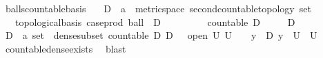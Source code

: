 \begin{isabellebody}
\begin{isamarkuptext}
\end{isamarkuptext}\isamarkuptrue%
\isamarkupfalse%
\ balls{\isacharunderscore}{\kern0pt}countable{\isacharunderscore}{\kern0pt}basis{\isacharcolon}{\kern0pt}\isanewline
\ \ \ D\ {\isacharcolon}{\kern0pt}{\isacharcolon}{\kern0pt}\ {\isachardoublequoteopen}{\isacharprime}{\kern0pt}a\ {\isacharcolon}{\kern0pt}{\isacharcolon}{\kern0pt}\ {\isacharbraceleft}{\kern0pt}metric{\isacharunderscore}{\kern0pt}space{\isacharcomma}{\kern0pt}\ second{\isacharunderscore}{\kern0pt}countable{\isacharunderscore}{\kern0pt}topology{\isacharbraceright}{\kern0pt}\ set{\isachardoublequoteclose}\ \isanewline
\ \ \ {\isachardoublequoteopen}topological{\isacharunderscore}{\kern0pt}basis\ {\isacharparenleft}{\kern0pt}case{\isacharunderscore}{\kern0pt}prod\ ball\ {\isacharbackquote}{\kern0pt}\ {\isacharparenleft}{\kern0pt}D\ {\isasymtimes}\ {\isacharparenleft}{\kern0pt}{\isasymrat}\ {\isasyminter}\ {\isacharbraceleft}{\kern0pt}{}{\isacharless}{\kern0pt}{\isachardot}{\kern0pt}{\isachardot}{\kern0pt}{\isacharbraceright}{\kern0pt}{\isacharparenright}{\kern0pt}{\isacharparenright}{\kern0pt}{\isacharparenright}{\kern0pt}{\isachardoublequoteclose}\isanewline
\ \ \ \ \ {\isachardoublequoteopen}countable\ D{\isachardoublequoteclose}\isanewline
\ \ \ \ \ {\isachardoublequoteopen}D\ {\isasymnoteq}\ {\isacharbraceleft}{\kern0pt}{\isacharbraceright}{\kern0pt}{\isachardoublequoteclose}\ \ \ \ \isanewline
%
\isadelimproof
%
\endisadelimproof
%
\isatagproof
{}\isamarkupfalse%
\ {\isacharminus}{\kern0pt}\isanewline
\ \ \isamarkupfalse%
\ D\ {\isacharcolon}{\kern0pt}{\isacharcolon}{\kern0pt}\ {\isachardoublequoteopen}{\isacharprime}{\kern0pt}a\ set{\isachardoublequoteclose}\ \ dense{\isacharunderscore}{\kern0pt}subset{\isacharcolon}{\kern0pt}\ {\isachardoublequoteopen}countable\ D{\isachardoublequoteclose}\ {\isachardoublequoteopen}D\ {\isasymnoteq}\ {\isacharbraceleft}{\kern0pt}{\isacharbraceright}{\kern0pt}{\isachardoublequoteclose}\ {\isachardoublequoteopen}{\isasymlbrakk}open\ U{\isacharsemicolon}{\kern0pt}\ U\ {\isasymnoteq}\ {\isacharbraceleft}{\kern0pt}{\isacharbraceright}{\kern0pt}{\isasymrbrakk}\ {\isasymLongrightarrow}\ {\isasymexists}y\ {\isasymin}\ D{\isachardot}{\kern0pt}\ y\ {\isasymin}\ U{\isachardoublequoteclose}\ \ U\ \isamarkupfalse%
\ countable{\isacharunderscore}{\kern0pt}dense{\isacharunderscore}{\kern0pt}exists\ \isamarkupfalse%
\ blast\isanewline

\end{isabellebody}

